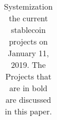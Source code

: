 \begin{table}[h!]
\begin{tabular}{|c|c|c|c|l|}
%
%					
%
%							


\end{tabular}
\caption{\footnotesize{Systemization the current stablecoin projects} on January 11, 2019. The Projects that are in bold are discussed in this paper.}
\label{tab:stablecoins}
\vspace{1em}
\end{table}
